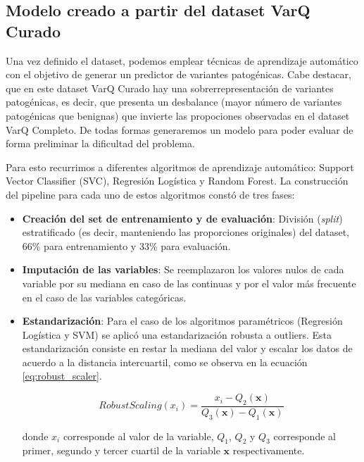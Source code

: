 
\subsection{Modelo creado a partir del dataset VarQ Curado}

Una vez definido el dataset, podemos emplear técnicas de aprendizaje automático con el objetivo de generar un predictor de variantes patogénicas. Cabe destacar, que en este dataset VarQ Curado hay una sobrerrepresentación de variantes patogénicas, es decir, que presenta un desbalance (mayor número de variantes patogénicas que benignas) que invierte las propociones observadas en el dataset VarQ Completo. De todas formas generaremos un modelo para poder evaluar de forma preliminar la dificultad del problema. 

Para esto recurrimos a diferentes algoritmos de aprendizaje automático: Support Vector Classifier (SVC), Regresión Logística y Random Forest. La construcción del pipeline para cada uno de estos algoritmos constó de tres fases: 

\begin{itemize}
    \item \textbf{Creación del set de entrenamiento y de evaluación}: División (\textit{split}) estratificado (es decir, manteniendo las proporciones originales) del dataset, 66\% para entrenamiento y 33\% para evaluación. 
    \item \textbf{Imputación de las variables}: Se reemplazaron los valores nulos de cada variable por su mediana en caso de las continuas y por el valor más frecuente en el caso de las variables categóricas.
    \item \textbf{Estandarización}: Para el caso de los algoritmos paramétricos (Regresión Logística y SVM) se aplicó una estandarización robusta a outliers. Esta estandarización consiste en restar la mediana del valor y escalar los datos de acuerdo a la distancia intercuartil, como se observa en la ecuación \ref{eq:robust_scaler}.
    
    \begin{equation}
        RobustScaling(x_i) = \frac{x_i - Q_2(\textbf{x})}{Q_3(\textbf{x}) - Q_1(\textbf{x})} 
        \label{eq:robust_scaler}
    \end{equation}
    
    donde $x_i$ corresponde al valor de la variable,  $Q_1$, $Q_2$ y $Q_3$ corresponde al primer, segundo y tercer cuartil de la variable $\textbf{x}$ respectivamente.
    
    
\end{itemize}

